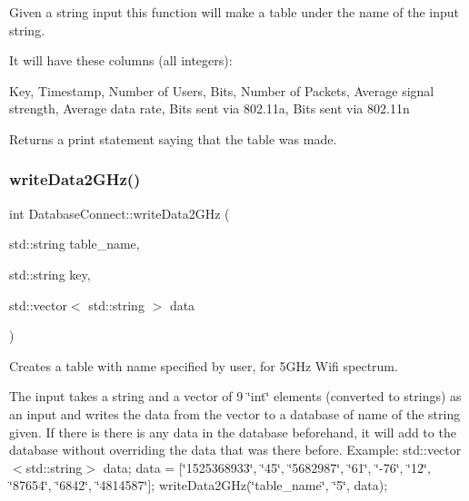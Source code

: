 Given a string input this function will make a table under the name of the input string.

It will have these columns (all integers)\+:

Key, Timestamp, Number of Users, Bits, Number of Packets, Average signal strength, Average data rate, Bits sent via 802.\+11a, Bits sent via 802.\+11n

Returns a print statement saying that the table was made. \mbox{\label{classDatabaseConnect_aa2fe852f7eaaa78f4172bde21fe65c4b}} 
\subsubsection{\texorpdfstring{write\+Data2\+G\+Hz()}{writeData2GHz()}}
{\footnotesize\ttfamily int Database\+Connect\+::write\+Data2\+G\+Hz (\begin{DoxyParamCaption}\item[{std\+::string}]{table\+\_\+name,  }\item[{std\+::string}]{key,  }\item[{std\+::vector$<$ std\+::string $>$}]{data }\end{DoxyParamCaption})}



Creates a table with name specified by user, for 5G\+Hz Wifi spectrum. 

The input takes a string and a vector of 9 \char`\"{}int\char`\"{} elements (converted to strings) as an input and writes the data from the vector to a database of name of the string given. If there is there is any data in the database beforehand, it will add to the database without overriding the data that was there before. Example\+: std\+::vector$<$std\+::string$>$ data; data = \mbox{[}\char`\"{}1525368933\char`\"{}, \char`\"{}45\char`\"{}, \char`\"{}5682987\char`\"{}, \char`\"{}61\char`\"{}, \char`\"{}-\/76\char`\"{}, \char`\"{}12\char`\"{}, \char`\"{}87654\char`\"{}, \char`\"{}6842\char`\"{}, \char`\"{}4814587\char`\"{}\mbox{]}; write\+Data2\+G\+Hz(\char`\"{}table\+\_\+name\char`\"{}, \char`\"{}5\char`\"{}, data); \mbox{\label{classDatabaseConnect_a4572abf2e9cc464dbdccd403c1ae4b08}} 
